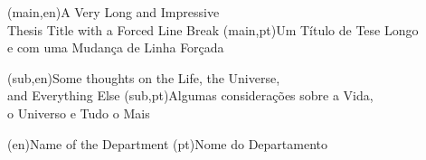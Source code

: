 
%




%
%
%
%
\nttitle(main,en){A Very Long and Impressive\\Thesis Title with a Forced Line Break}%
\nttitle(main,pt){Um Título de Tese Longo\\e com uma Mudança de Linha Forçada}%

\nttitle(sub,en){Some thoughts on the Life, the Universe,\\and Everything Else}%
\nttitle(sub,pt){Algumas considerações sobre a Vida,\\o Universo e Tudo o Mais}%



%
%
%
%
\ntdepartment(en){Name of the Department} %
\ntdepartment(pt){Nome do Departamento}   %



